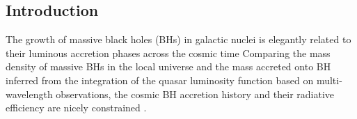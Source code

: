 \documentclass[twocolumn, twocolappendix]{aastex63}
\begin{document}
\begin{CJK*}{UTF8}{gbsn}


\vspace{5mm}
\section{Introduction} \label{sec:intro}
The growth of massive black holes (BHs) in galactic nuclei is elegantly related to their luminous accretion phases
across the cosmic time \citep{1982MNRAS.200..115S}%
Comparing the mass density of massive BHs in the local universe and the mass accreted onto BH inferred from
the integration of the quasar luminosity function based on multi-wavelength observations,
the cosmic BH accretion history and their radiative efficiency are nicely constrained 
\citep[e.g.][]{1971ApJ...170..223C,1992MNRAS.259..725S,2002MNRAS.335..965Y,2004MNRAS.351..169M,2008MNRAS.388.1011M,2004MNRAS.354.1020S,
2009ApJ...690...20S,2014MNRAS.439.2736D,2014ApJ...786..104U,2017A&A...600A..64T}.


\end{CJK*}
\end{document}
